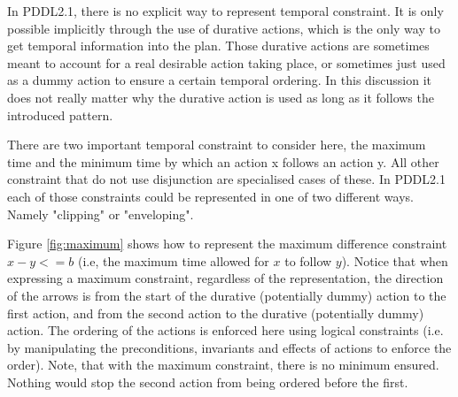 \documentclass
[a4paper
,english
,parskip=half
,bibliography=totoc
]{scrreprt}
\begin{document}
        In PDDL2.1, there is no explicit way to represent temporal constraint. It is only possible implicitly through the use of durative actions, which is the only way to get temporal information into the plan. Those durative actions are sometimes meant to account for a real desirable action taking place, or sometimes just used as a dummy action to ensure a certain temporal ordering. In this discussion it does not really matter why the durative action is used as long as it follows the introduced pattern. 

        There are two important temporal constraint to consider here, the maximum time and the minimum time by which an action x follows an action y. All other constraint that do not use disjunction are specialised cases of these. In PDDL2.1 each of those constraints could be represented in one of two different ways. Namely "clipping"  or "enveloping". 

        Figure \ref{fig:maximum} shows how to represent the maximum difference constraint \(x-y<=b\) (i.e, the maximum time allowed for \(x\) to follow \(y\)). Notice that when expressing a maximum constraint, regardless of the representation, the direction of the arrows is from the start of the durative (potentially dummy) action to the first action, and from the second action to the durative (potentially dummy) action. The ordering of the actions is enforced here using logical constraints (i.e. by manipulating the preconditions, invariants and effects of actions to enforce the order). Note, that with the maximum constraint, there is no minimum ensured. Nothing would stop the second action from being ordered before the first.
        
\end{document}
